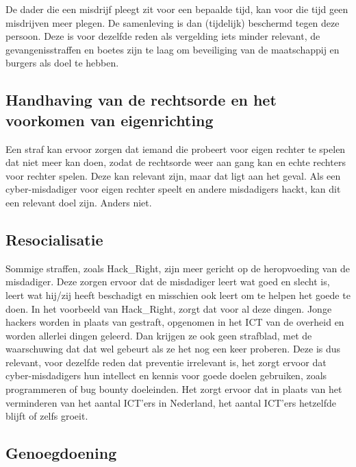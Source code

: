 \documentclass[
]{article}
\begin{document}
De dader die een misdrijf pleegt zit voor een bepaalde tijd, kan voor
die tijd geen misdrijven meer plegen. De samenleving is dan (tijdelijk)
beschermd tegen deze persoon. Deze is voor dezelfde reden als vergelding
iets minder relevant, de gevangenisstraffen en boetes zijn te laag om
beveiliging van de maatschappij en burgers als doel te hebben.

\hypertarget{handhaving-van-de-rechtsorde-en-het-voorkomen-van-eigenrichting}{%
\subsection{Handhaving van de rechtsorde en het voorkomen van
eigenrichting}\label{handhaving-van-de-rechtsorde-en-het-voorkomen-van-eigenrichting}}

Een straf kan ervoor zorgen dat iemand die probeert voor eigen rechter
te spelen dat niet meer kan doen, zodat de rechtsorde weer aan gang kan
en echte rechters voor rechter spelen. Deze kan relevant zijn, maar dat
ligt aan het geval. Als een cyber-misdadiger voor eigen rechter speelt
en andere misdadigers hackt, kan dit een relevant doel zijn. Anders
niet.

\hypertarget{resocialisatie}{%
\subsection{Resocialisatie}\label{resocialisatie}}

Sommige straffen, zoals Hack\_Right, zijn meer gericht op de
heropvoeding van de misdadiger. Deze zorgen ervoor dat de misdadiger
leert wat goed en slecht is, leert wat hij/zij heeft beschadigt en
misschien ook leert om te helpen het goede te doen. In het voorbeeld van
Hack\_Right, zorgt dat voor al deze dingen. Jonge hackers worden in
plaats van gestraft, opgenomen in het ICT van de overheid en worden
allerlei dingen geleerd. Dan krijgen ze ook geen strafblad, met de
waarschuwing dat dat wel gebeurt als ze het nog een keer proberen. Deze
is dus relevant, voor dezelfde reden dat preventie irrelevant is, het
zorgt ervoor dat cyber-misdadigers hun intellect en kennis voor goede
doelen gebruiken, zoals programmeren of bug bounty doeleinden. Het zorgt
ervoor dat in plaats van het verminderen van het aantal ICT'ers in
Nederland, het aantal ICT'ers hetzelfde blijft of zelfs groeit.

\hypertarget{genoegdoening}{%
\subsection{Genoegdoening}\label{genoegdoening}}
\end{document}
